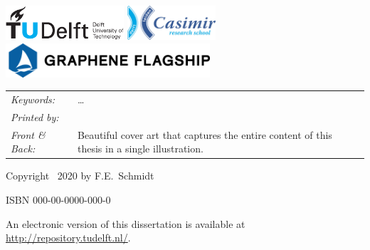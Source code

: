 \begin{titlepage}

\vfill
\begin{center}
    \centering
    \includegraphics[height=0.5in]{title/logos/tudelft}
    \hspace{2em}
    \includegraphics[height=0.5in]{title/logos/casimir}
    \vspace{0.5cm}\newline
    \includegraphics[height=0.5in]{title/logos/flagship}
\end{center}
\vfill

\noindent
\begin{tabular}{@{}p{}@{}p{}}
    \textit{Keywords:} & \ldots \\[\medskipamount]
    \textit{Printed by:} &  \\[\medskipamount]
    \textit{Front \& Back:} & Beautiful cover art that captures the entire content of this thesis in a single illustration.
\end{tabular}

\vspace{4\bigskipamount}

\noindent Copyright \textcopyright\ 2020 by F.E.~Schmidt


\medskip
\noindent ISBN 000-00-0000-000-0

\medskip
\noindent An electronic version of this dissertation is available at \\
\url{http://repository.tudelft.nl/}.

\end{titlepage}

